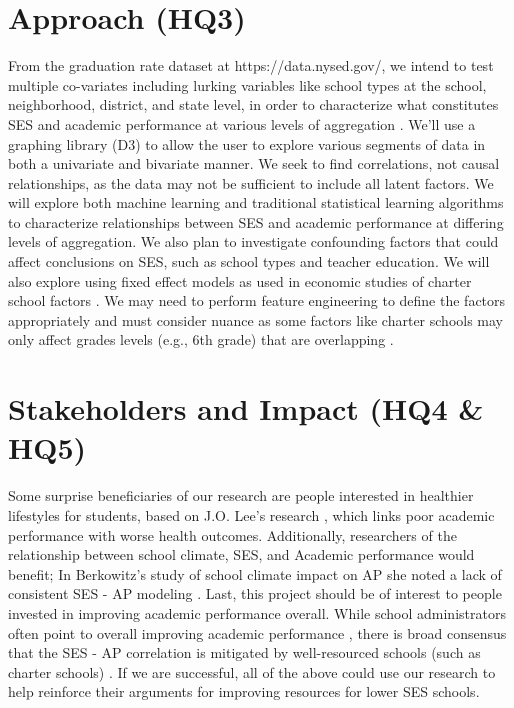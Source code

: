 \documentclass[sigconf,nonacm,11pt]{acmart}
\begin{document}
\section{Approach (HQ3)}
From the graduation rate dataset at  https://data.nysed.gov/, we intend to test multiple co-variates including lurking variables like school types \cite{west} at the school, neighborhood, district, and state level, in order to characterize what constitutes SES and academic performance at various levels of aggregation . We'll use a graphing library (D3) to allow the user to explore various segments of data in both a univariate and bivariate manner. We seek to find correlations, not causal relationships, as the data may not be sufficient to include all latent factors. We will explore both machine learning and traditional statistical learning algorithms to characterize relationships between SES and academic performance at differing levels of aggregation. We also plan to investigate confounding factors that could affect conclusions on SES, such as school types and teacher education. We will also explore using fixed effect models as used in economic studies of charter school factors \cite{winters, jinnai}. We may need to perform feature engineering to define the factors appropriately and must consider nuance as some factors like charter schools may only affect grades levels (e.g., 6th grade) that are overlapping \cite{jinnai}.

\section{Stakeholders and Impact (HQ4 \& HQ5)}
Some surprise beneficiaries of our research are people interested in healthier lifestyles for students, based on J.O. Lee's research \cite{lee}, which links poor academic performance with worse health outcomes. Additionally, researchers of the relationship between school climate, SES, and Academic performance would benefit; In Berkowitz's study of school climate impact on AP she noted a lack of consistent SES - AP modeling \cite{berkowitz}. Last, this project should be of interest to people invested in improving academic performance overall. While school administrators often point to overall improving academic performance \cite{domanico}, there is broad consensus that the SES - AP correlation is mitigated by well-resourced schools (such as charter schools) \cite{domanico, jinnai}. If we are successful, all of the above could use our research to help reinforce their arguments for improving resources for lower SES schools.
\end{document}
